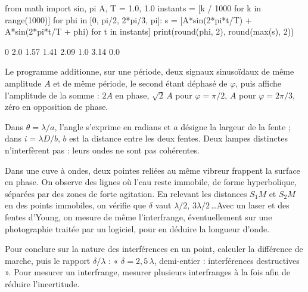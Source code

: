 \begin{codecote}[0.64]
\begin{pythoncol}
from math import sin, pi
A, T = 1.0, 1.0
instants = [k / 1000 for k in range(1000)]
for phi in [0, pi/2, 2*pi/3, pi]:
    s = [A*sin(2*pi*t/T) + A*sin(2*pi*t/T + phi)
         for t in instants]
    print(round(phi, 2), round(max(s), 2))
\end{pythoncol}
\begin{consolecol}
0 2.0
1.57 1.41
2.09 1.0
3.14 0.0
\end{consolecol}
\cote
\fontsize{9.5}{12.5}\selectfont
{}\par\smallskip
Le programme additionne, sur une période, deux signaux sinusoïdaux de même amplitude $A$ et de même période, le
second étant déphasé de $\varphi$, puis affiche l'amplitude de la somme : $2A$ en phase, $\sqrt2\,A$ pour
$\varphi=\pi/2$, $A$ pour $\varphi=2\pi/3$, zéro en opposition de phase.
\end{codecote}
\begin{attention}
Dans $\theta=\lambda/a$, l'angle s'exprime en radians et $a$ désigne la largeur de la fente ; dans $i=\lambda D/b$, $b$ est la
distance entre les deux fentes. Deux lampes distinctes n'interfèrent pas : leurs ondes ne sont pas cohérentes.
\end{attention}
\begin{experience}
Dans une cuve à ondes, deux pointes reliées au même vibreur frappent la surface en phase. On observe des lignes où
l'eau reste immobile, de forme hyperbolique, séparées par des zones de forte agitation. En relevant les distances
$S_1M$ et $S_2M$ en des points immobiles, on vérifie que $\delta$ vaut $\lambda/2$, $3\lambda/2$\,\dots Avec un laser et des
fentes d'Young, on mesure de même l'interfrange, éventuellement sur une photographie traitée par un logiciel, pour en
déduire la longueur d'onde.
\end{experience}
\begin{rediger}
Pour conclure sur la nature des interférences en un point, calculer la différence de marche, puis le rapport
$\delta/\lambda$ : « $\delta=2{,}5\,\lambda$, demi-entier : interférences destructives ». Pour mesurer un interfrange, mesurer
plusieurs interfranges à la fois afin de réduire l'incertitude.
\end{rediger}
\exercices

